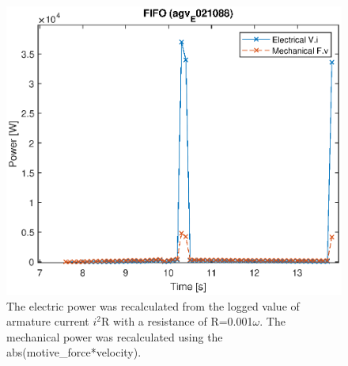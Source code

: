 \documentclass[]{article}
\begin{document}
\begin{figure}
	\includegraphics[width=1.0\linewidth]{agv_e_021088_power_-FIFO-HighLatency-HighTraffic-recalc.eps}
	\caption{The electric power was recalculated from the logged value of armature current $i^2$R with a resistance of R=0.001$\omega$. The mechanical power was recalculated using the abs(motive\_force*velocity).}
	\label{fig:recalc_021088power}       %
\end{figure}
\end{document}
